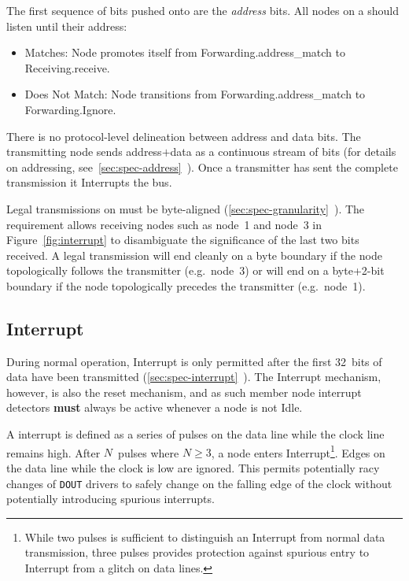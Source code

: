 The first sequence of bits pushed onto \bus are the {\em address} bits. All
nodes on a \bus should listen until their address:
\begin{itemize}
  \item Matches: Node promotes itself from Forwarding.{\sc address\_match} to
    Receiving.{\sc receive}.
  \item Does Not Match: Node transitions from Forwarding.{\sc address\_match}
    to Forwarding.{\sc Ignore}.
\end{itemize}

There is no protocol-level delineation between address and data bits. The
transmitting node sends address$+$data as a continuous stream of bits (for
details on \bus addressing,
see~\ref{sec:spec-address}~). Once a transmitter has
sent the complete transmission it Interrupts the bus.

Legal transmissions on \bus must be byte-aligned
(\ref{sec:spec-granularity}~). The requirement
allows receiving nodes such as node~1 and node~3 in Figure~\ref{fig:interrupt}
to disambiguate the significance of the last two bits received. A legal
transmission will end cleanly on a byte boundary if the node topologically
follows the transmitter (e.g.~node~3) or will end on a byte+2-bit boundary if
the node topologically precedes the transmitter (e.g.~node~1).

\subsection{Interrupt}
\label{sec:protocol-interrupt}
During normal operation, Interrupt is only permitted after the first 32~bits
of data have been transmitted
(\ref{sec:spec-interrupt}~). The Interrupt
mechanism, however, is also the \bus reset mechanism, and as such member node
interrupt detectors {\bf must} always be active whenever a node is not Idle.

A \bus interrupt is defined as a series of pulses on the data line while the
clock line remains high. After $N$~pulses where $N \ge 3$, a node enters
Interrupt\footnote{
  While two pulses is sufficient to distinguish an Interrupt from normal data
  transmission, three pulses provides protection against spurious entry to
  Interrupt from a glitch on data lines.}.
Edges on the data line while the clock is low are ignored. This permits
potentially racy changes of {\tt DOUT} drivers to safely change on the falling
edge of the clock without potentially introducing spurious interrupts.

